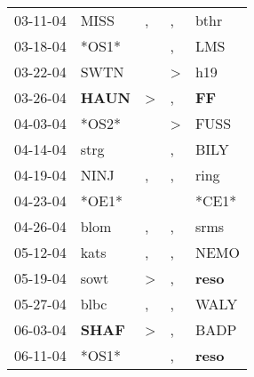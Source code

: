 \begin{supertabular}{p{0.07\textwidth}p{0.06\textwidth}p{0.02\textwidth}p{0.02\textwidth}p{0.06\textwidth}}
          03-11-04\textsuperscript{} &           MISS\textsuperscript{} &                , &                , &           bthr\textsuperscript{} \\
          03-18-04\textsuperscript{} &                            *OS1* &                  &                , &            LMS\textsuperscript{} \\
          03-22-04\textsuperscript{} &           SWTN\textsuperscript{} &                  &     \textgreater &            h19\textsuperscript{} \\
          03-26-04\textsuperscript{} &  \textbf{HAUN\textsuperscript{}} &     \textgreater &                , &    \textbf{FF\textsuperscript{}} \\
          04-03-04\textsuperscript{} &                            *OS2* &                  &     \textgreater &           FUSS\textsuperscript{} \\
          04-14-04\textsuperscript{} &           strg\textsuperscript{} &                  &                , &           BILY\textsuperscript{} \\
          04-19-04\textsuperscript{} &           NINJ\textsuperscript{} &                , &                , &           ring\textsuperscript{} \\
          04-23-04\textsuperscript{} &                            *OE1* &                  &                  &                            *CE1* \\
          04-26-04\textsuperscript{} &           blom\textsuperscript{} &                , &                , &           srms\textsuperscript{} \\
          05-12-04\textsuperscript{} &           kats\textsuperscript{} &                , &                , &           NEMO\textsuperscript{} \\
          05-19-04\textsuperscript{} &           sowt\textsuperscript{} &     \textgreater &                , &  \textbf{reso\textsuperscript{}} \\
          05-27-04\textsuperscript{} &           blbc\textsuperscript{} &                , &                , &           WALY\textsuperscript{} \\
          06-03-04\textsuperscript{} &  \textbf{SHAF\textsuperscript{}} &     \textgreater &                , &           BADP\textsuperscript{} \\
          06-11-04\textsuperscript{} &                            *OS1* &                  &                , &  \textbf{reso\textsuperscript{}} \\

\end{supertabular}
